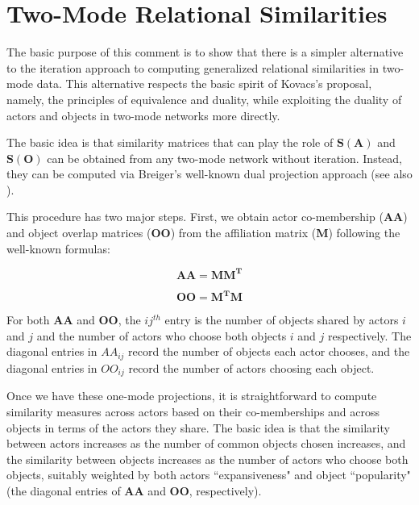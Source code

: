 \documentclass[a4paper,fleqn]{cas-sc}
\begin{document}
\section{Two-Mode Relational Similarities}
The basic purpose of this comment is to show that there is a simpler alternative to the iteration approach to computing generalized relational similarities in two-mode data. This alternative respects the basic spirit of Kovacs's proposal, namely, the principles of equivalence and duality, while exploiting the duality of actors and objects in two-mode networks more directly.

The basic idea is that similarity matrices that can play the role of $\mathbf{S(A)}$ and $\mathbf{S(O)}$ can be obtained from any two-mode network without iteration. Instead, they can be computed via Breiger's \citeyearpar{breiger1974} well-known dual projection approach (see also \citep{everett2013}). 

This procedure has two major steps. First, we obtain actor co-membership ($\mathbf{AA}$) and object overlap matrices ($\mathbf{OO}$) from the affiliation matrix ($\mathbf{M}$) following the well-known formulas:

\begin{equation}
    \mathbf{AA} = \mathbf{MM^T}
    \label{eq:4}
\end{equation}


\begin{equation}
    \mathbf{OO} = \mathbf{M^TM}
    \label{eq:5}
\end{equation}

For both $\mathbf{AA}$ and $\mathbf{OO}$, the $ij^{th}$ entry is the number of objects shared by actors $i$ and $j$ and the number of actors who choose both objects $i$ and $j$ respectively. The diagonal entries in $AA_{ij}$ record the number of objects each actor chooses, and the diagonal entries in $OO_{ij}$ record the number of actors choosing each object. 

Once we have these one-mode projections, it is straightforward to compute similarity measures across actors based on their co-memberships and across objects in terms of the actors they share. The basic idea is that the similarity between actors increases as the number of common objects chosen increases, and the similarity between objects increases as the number of actors who choose both objects, suitably weighted by both actors ``expansiveness" and object ``popularity" (the diagonal entries of $\mathbf{AA}$ and $\mathbf{OO}$, respectively). 
\end{document}
